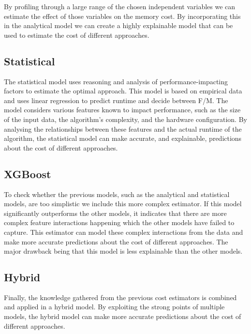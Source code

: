 
By profiling through a large range of the chosen independent variables we can estimate the effect of those variables on the memory cost. By incorporating this in the analytical model we can create a highly explainable model that can be used to estimate the cost of different approaches.

\subsection{Statistical}
The statistical model uses reasoning and analysis of performance-impacting factors to estimate the optimal approach. This model is based on empirical data and uses linear regression to predict runtime and decide between F/M. The model considers various features known to impact performance, such as the size of the input data, the algorithm's complexity, and the hardware configuration. By analysing the relationships between these features and the actual runtime of the algorithm, the statistical model can make accurate, and explainable, predictions about the cost of different approaches.

\subsection{XGBoost}
To check whether the previous models, such as the analytical and statistical models, are too simplistic we include this more complex estimator. If this model significantly outperforms the other models, it indicates that there are more complex feature interactions happening which the other models have failed to capture. This estimator can model these complex interactions from the data and make more accurate predictions about the cost of different approaches. The major drawback being that this model is less explainable than the other models.

\subsection{Hybrid}
Finally, the knowledge gathered from the previous cost estimators is combined and applied in a hybrid model. By exploiting the strong points of multiple models, the hybrid model can make more accurate predictions about the cost of different approaches.
